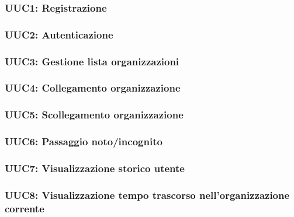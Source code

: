 \documentclass[../analisi-dei-requisiti.tex]{subfiles}
\begin{document}
\subsubsection{UUC1: Registrazione}%
\label{subs:UUC1}



\subsubsection{UUC2: Autenticazione}%
\label{subs:UUC2}



\subsubsection{UUC3: Gestione lista organizzazioni}%
\label{subs:UUC3}



\subsubsection{UUC4: Collegamento organizzazione}%
\label{subs:UUC4}



\subsubsection{UUC5: Scollegamento organizzazione}%
\label{subs:UUC5}



\subsubsection{UUC6: Passaggio noto/incognito}%
\label{subs:UUC6}



\subsubsection{UUC7: Visualizzazione storico utente}%
\label{subs:UUC7}




\subsubsection{UUC8: Visualizzazione tempo trascorso nell'organizzazione corrente}%
\label{subs:UUC8}
\end{document}
